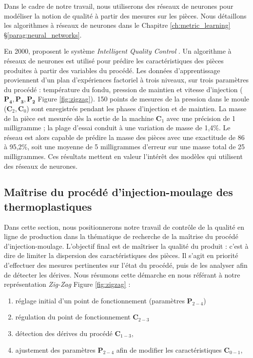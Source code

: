 Dans le cadre de notre travail, nous utiliserons des réseaux de neurones pour modéliser la notion de qualité à partir des mesures sur les pièces.
Nous détaillons les algorithmes à réseaux de neurones dans le Chapitre \ref{ch:metric_learning} §\ref{parag:neural_networks}.

En 2000, \citeauthor{schnerr-haselbarth_automation_2000} proposent le système \textit{Intelligent Quality Control} \cite{schnerr-haselbarth_automation_2000}.
Un algorithme à réseaux de neurones est utilisé pour prédire les caractéristiques des pièces produites à partir des variables du procédé.
Les données d’apprentissage proviennent d’un plan d'expériences factoriel à trois niveaux, sur trois paramètres du procédé : température du fondu, pression de maintien et vitesse d’injection ($\boldsymbol{P_4, P_3, P_2}$ Figure \ref{fig:zigzag}).
150 points de mesures de la pression dans le moule ($\boldsymbol{C}_2, \boldsymbol{C}_0$) sont enregistrés pendant les phases d’injection et de maintien.
La masse de la pièce est mesurée dès la sortie de la machine $\boldsymbol{C}_1$ avec une précision de 1 milligramme ; la plage d’essai conduit à une variation de masse de 1,4\%.
Le réseau est alors capable de prédire la masse des pièces avec une exactitude de 86 à 95,2\%, soit une moyenne de 5 milligrammes d’erreur sur une masse total de 25 milligrammes.
Ces résultats mettent en valeur l'intérêt des modèles qui utilisent des réseaux de neurones.


\subsection{Maîtrise du procédé d'injection-moulage des thermoplastiques} \label{subsec:process_control}
Dans cette section, nous positionnerons notre travail de contrôle de la qualité en ligne de production dans la thématique de recherche de la maîtrise du procédé d'injection-moulage.
L'objectif final est de maîtriser la qualité du produit : c'est à dire de limiter la dispersion des caractéristiques des pièces.
Il s'agit en priorité d'effectuer des mesures pertinentes sur l'état du procédé, puis de les analyser afin de détecter les dérives. Nous résumons cette démarche en nous référant à notre représentation \textit{Zig-Zag} Figure \ref{fig:zigzag} :
\begin{enumerate}
	\item réglage initial d'un point de fonctionnement (paramètres $\boldsymbol{P}_{2-4}$)  %
	\item régulation du point de fonctionnement $\boldsymbol{C}_{2-3}$  %
	\item détection des dérives du procédé $\boldsymbol{C}_{1-3}$,
	\item ajustement des paramètres $\boldsymbol{P}_{2-4}$ afin de modifier les caractéristiques $\boldsymbol{C}_{0-1}$,
\end{enumerate}

